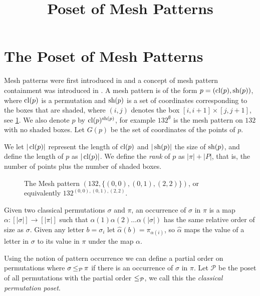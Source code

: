 \documentclass[11pt,a4paper,oneside]{article}
\title{Poset of Mesh Patterns}
\begin{document}
	\maketitle


\section{The Poset of Mesh Patterns}

Mesh patterns were first introduced in \cite{Bra11} and a concept of mesh
pattern containment was introduced in \cite{TU17}. A mesh pattern is of the form
$p=(\operatorname{\textrm{cl}}(p),\operatorname{\textrm{sh}}(p))$, where $\operatorname{\textrm{cl}}(p)$ is a permutation and $\operatorname{\textrm{sh}}(p)$ is a set of
coordinates corresponding to the boxes that are shaded, where $(i,j)$ denotes
the box $[i,i+1]\times[j,j+1]$, see \cref{fig:132}. We also denote $p$ by
$\operatorname{\textrm{cl}}(p)^{\operatorname{\textrm{sh}}(p)}$, for example $132^\emptyset$ is the mesh pattern on $132$ with
no shaded boxes. Let $G(p)$ be the set of coordinates of the points of $p$.

We let $|\operatorname{\textrm{cl}}(p)|$ represent the length of $\operatorname{\textrm{cl}}(p)$ and $|\operatorname{\textrm{sh}}(p)|$ the size of
$\operatorname{\textrm{sh}}(p)$, and define the length of $p$ as $|\operatorname{\textrm{cl}}(p)|$. We define the \emph{rank}
of $p$ as $|\pi|+|P|$, that is, the number of points plus the number of shaded
boxes.


\begin{figure}\centering{}
\caption{The Mesh pattern $(132,\{(0,0),(0,1),(2,2)\})$, or equivalently $132^{(0,0),(0,1),(2,2)}$.}\label{fig:132}\end{figure}

Given two classical permutations $\sigma$ and $\pi$, an occurrence of $\sigma$
in $\pi$ is a map $\alpha:[|\sigma|]\rightarrow[|\pi|]$ such that
$\alpha(1)\alpha(2)\ldots\alpha(|\sigma|)$ has the same relative order of size
as $\sigma$. Given any letter $b=\sigma_i$ let
$\hat{\alpha}(b)=\pi_{\alpha(i)}$, so $\hat{\alpha}$ maps the value of a letter
in $\sigma$ to its value in $\pi$ under the map $\alpha$.

Using the notion of pattern occurrence we can define a partial order on
permutations where $\sigma\operatorname{\le_{\mathcal{P}}}\pi$ if there is an occurrence of $\sigma$ in
$\pi$. Let $\mathcal{P}$ be the poset of all permutations with the partial order
$\operatorname{\le_{\mathcal{P}}}$, we call this the \emph{classical permutation poset}.
\end{document}
